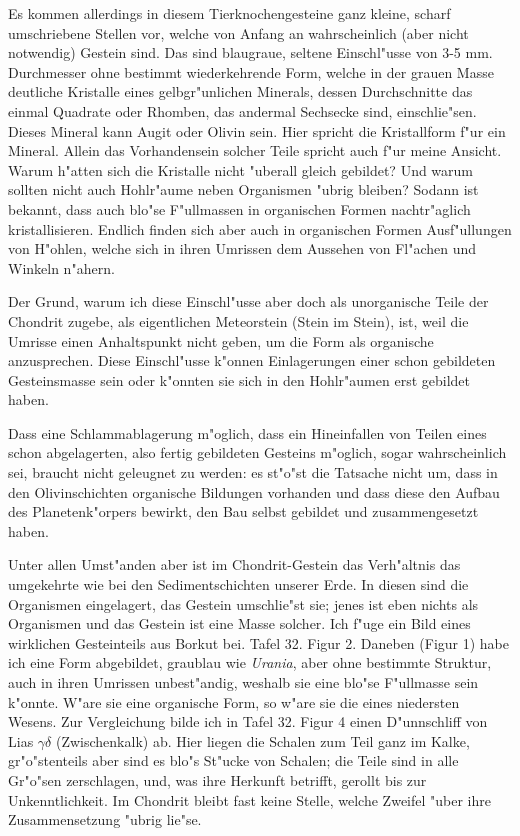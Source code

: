 \documentclass[a4paper, 11pt, oneside]{article}
\begin{document}
Es kommen allerdings in diesem Tierknochengesteine ganz kleine, scharf umschriebene Stellen vor, welche von Anfang an wahrscheinlich (aber nicht notwendig) Gestein sind. Das sind blaugraue, seltene Einschl"usse von 3-5 mm. Durchmesser ohne bestimmt wiederkehrende Form, welche in der grauen Masse deutliche Kristalle eines gelbgr"unlichen Minerals, dessen Durchschnitte das einmal Quadrate oder Rhomben, das andermal Sechsecke sind, einschlie"sen. Dieses Mineral kann Augit oder Olivin sein. Hier spricht die Kristallform f"ur ein Mineral. Allein das Vorhandensein solcher Teile spricht auch f"ur meine Ansicht. Warum h"atten sich die Kristalle nicht "uberall gleich gebildet? Und warum sollten nicht auch Hohlr"aume neben Organismen "ubrig bleiben? Sodann ist bekannt, dass auch blo"se F"ullmassen in organischen Formen nachtr"aglich kristallisieren. Endlich finden sich aber auch in organischen Formen Ausf"ullungen von H"ohlen, welche sich in ihren Umrissen dem Aussehen von Fl"achen und Winkeln n"ahern.

Der Grund, warum ich diese Einschl"usse aber doch als unorganische Teile der Chondrit zugebe, als eigentlichen Meteorstein (Stein im Stein), ist, weil die Umrisse einen Anhaltspunkt nicht geben, um die Form als organische anzusprechen. Diese Einschl"usse k"onnen Einlagerungen einer schon gebildeten Gesteinsmasse sein oder k"onnten sie sich in den Hohlr"aumen erst gebildet haben.

Dass eine Schlammablagerung m"oglich, dass ein Hineinfallen von Teilen eines schon abgelagerten, also fertig gebildeten Gesteins m"oglich, sogar wahrscheinlich sei, braucht nicht geleugnet zu werden: es st"o"st die Tatsache nicht um, dass in den Olivinschichten organische Bildungen vorhanden und dass diese den Aufbau des Planetenk"orpers bewirkt, den Bau selbst gebildet und zusammengesetzt haben.

Unter allen Umst"anden aber ist im Chondrit-Gestein das Verh"altnis das umgekehrte wie bei den Sedimentschichten unserer Erde. In diesen sind die Organismen eingelagert, das Gestein umschlie"st sie; jenes ist eben nichts als Organismen und das Gestein ist eine Masse solcher. Ich f"uge ein Bild eines wirklichen Gesteinteils aus Borkut bei. Tafel 32. Figur 2. Daneben (Figur 1) habe ich eine Form abgebildet, graublau wie \emph{Urania}, aber ohne bestimmte Struktur, auch in ihren Umrissen unbest"andig, weshalb sie eine blo"se F"ullmasse sein k"onnte. W"are sie eine organische Form, so w"are sie die eines niedersten Wesens. Zur Vergleichung bilde ich in Tafel 32. Figur 4 einen D"unnschliff von Lias $\gamma\delta$ (Zwischenkalk) ab. Hier liegen die Schalen zum Teil ganz im Kalke, gr"o"stenteils aber sind es blo"s St"ucke von Schalen; die Teile sind in alle Gr"o"sen zerschlagen, und, was ihre Herkunft betrifft, gerollt bis zur Unkenntlichkeit. Im Chondrit bleibt fast keine Stelle, welche Zweifel "uber ihre Zusammensetzung "ubrig lie"se.
\clearpage
\end{document}
